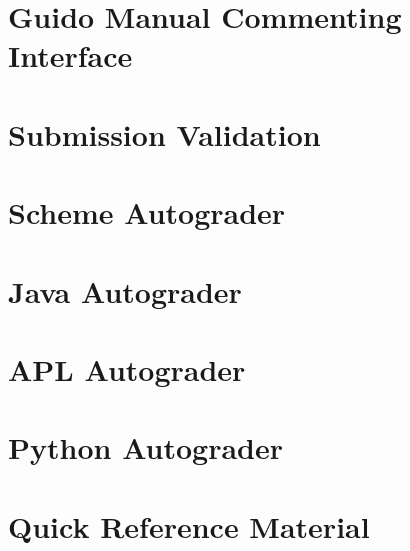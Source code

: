 \chapter{Guido Manual Commenting Interface}

\chapter{Submission Validation}

\chapter{Scheme Autograder}

\chapter{Java Autograder}

\chapter{APL Autograder}

\chapter{Python Autograder}

\chapter{Quick Reference Material}

\bye
